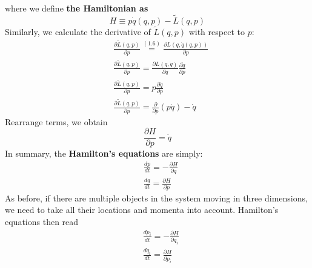 where we define \textbf{the Hamiltonian as}
\begin{equation}
H \equiv p \dot{q}(q, p)-\tilde{L}(q, p)
\end{equation}
Similarly, we calculate the derivative of $\tilde{L}(q,p)$ with respect to $p$:
$$
\begin{aligned}
&\frac{\partial \tilde{L}(q, p)}{\partial p} \stackrel{(1.6)}{=} \frac{\partial L(q, \dot{q}(q, p))}{\partial p}\\
&\frac{\partial \tilde{L}(q, p)}{\partial p}=\frac{\partial L(q, \dot{q})}{\partial \dot{q}} \frac{\partial \dot{q}}{\partial p}\\
&\frac{\partial \tilde{L}(q, p)}{\partial p}=p \frac{\partial \dot{q}}{\partial p}\\
&\frac{\partial \tilde{L}(q, p)}{\partial p}=\frac{\partial}{\partial p}(p \dot{q})-\dot{q}
\end{aligned}
$$
Rearrange terms, we obtain
\begin{equation}
\frac{\partial H}{\partial p}=\dot{q}
\end{equation}
In summary, the \textbf{Hamilton's equations} are simply:
\begin{equation}
\begin{aligned}
&\frac{d p}{d t}=-\frac{\partial H}{\partial q}\\
&\frac{d q}{d t}=\frac{\partial H}{\partial p}
\end{aligned}
\end{equation}
As before, if there are multiple objects in the system moving in three dimensions, we need to take all their locations and momenta into account. Hamilton's equations then read
\begin{equation}
\begin{aligned}
&\frac{d p_{i}}{d t}=-\frac{\partial H}{\partial q_{i}}\\
&\frac{d q_{i}}{d t}=\frac{\partial H}{\partial p_{i}}
\end{aligned}
\end{equation}

